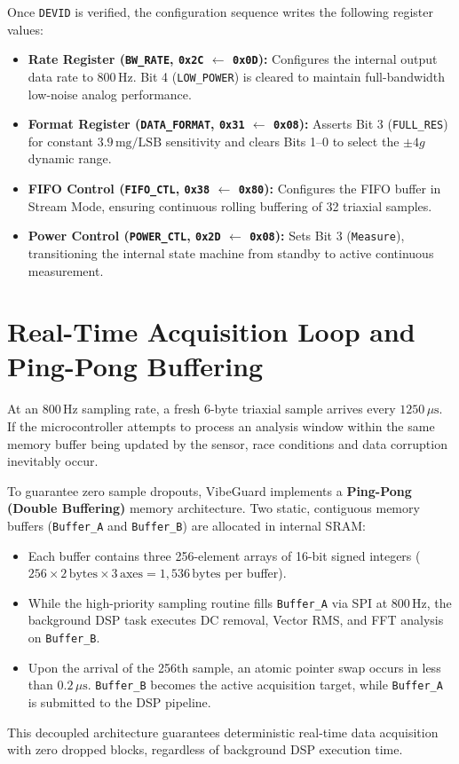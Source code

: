 Once \texttt{DEVID} is verified, the configuration sequence writes the following register values:
\begin{itemize}
    \item \textbf{Rate Register (\texttt{BW\_RATE}, \texttt{0x2C} $\leftarrow$ \texttt{0x0D}):} Configures the internal output data rate to $800$\,Hz. Bit 4 (\texttt{LOW\_POWER}) is cleared to maintain full-bandwidth low-noise analog performance.
    \item \textbf{Format Register (\texttt{DATA\_FORMAT}, \texttt{0x31} $\leftarrow$ \texttt{0x08}):} Asserts Bit 3 (\texttt{FULL\_RES}) for constant $3.9\,\text{mg/LSB}$ sensitivity and clears Bits 1--0 to select the $\pm 4g$ dynamic range.
    \item \textbf{FIFO Control (\texttt{FIFO\_CTL}, \texttt{0x38} $\leftarrow$ \texttt{0x80}):} Configures the FIFO buffer in Stream Mode, ensuring continuous rolling buffering of 32 triaxial samples.
    \item \textbf{Power Control (\texttt{POWER\_CTL}, \texttt{0x2D} $\leftarrow$ \texttt{0x08}):} Sets Bit 3 (\texttt{Measure}), transitioning the internal state machine from standby to active continuous measurement.
\end{itemize}

\section{Real-Time Acquisition Loop and Ping-Pong Buffering}
At an 800\,Hz sampling rate, a fresh 6-byte triaxial sample arrives every $1250\,\mu\text{s}$. If the microcontroller attempts to process an analysis window within the same memory buffer being updated by the sensor, race conditions and data corruption inevitably occur.

To guarantee zero sample dropouts, VibeGuard implements a \textbf{Ping-Pong (Double Buffering)} memory architecture. Two static, contiguous memory buffers (\texttt{Buffer\_A} and \texttt{Buffer\_B}) are allocated in internal SRAM:
\begin{itemize}
    \item Each buffer contains three 256-element arrays of 16-bit signed integers ($256 \times 2\,\text{bytes} \times 3\,\text{axes} = 1,536\,\text{bytes}$ per buffer).
    \item While the high-priority sampling routine fills \texttt{Buffer\_A} via SPI at 800\,Hz, the background DSP task executes DC removal, Vector RMS, and FFT analysis on \texttt{Buffer\_B}.
    \item Upon the arrival of the 256th sample, an atomic pointer swap occurs in less than $0.2\,\mu\text{s}$. \texttt{Buffer\_B} becomes the active acquisition target, while \texttt{Buffer\_A} is submitted to the DSP pipeline.
\end{itemize}
This decoupled architecture guarantees deterministic real-time data acquisition with zero dropped blocks, regardless of background DSP execution time.

